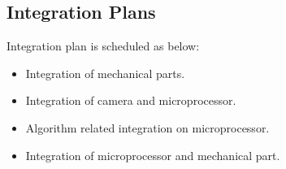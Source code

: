 
\subsection{Integration Plans}

Integration plan is scheduled as below:
\begin{itemize}
\item Integration of mechanical parts.
\item Integration of camera and microprocessor.
\item Algorithm related integration on microprocessor.
\item Integration of microprocessor and mechanical part.
\end{itemize}





